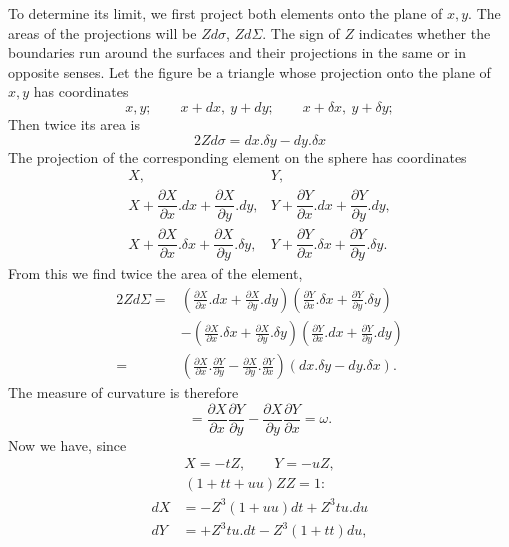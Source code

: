 \par{}%
\noindent\hspace*{1.2em}To determine its limit, we first project both elements onto the plane of $x,y$. The areas of the projections will be $Zd\sigma$, $Zd\Sigma$. The sign of $Z$ indicates whether the boundaries run around the surfaces and their projections in the same or in opposite senses. Let the figure be a triangle whose projection onto the plane of $x,y$ has coordinates
\[
x,y;\qquad x+dx,\ y+dy;\qquad x+\delta x,\ y+\delta y;
\]
Then twice its area is
\[
2Zd\sigma=dx.\delta y-dy.\delta x
\]
The projection of the corresponding element on the sphere has coordinates
\[
\begin{array}{cc}
X,&Y,\\[4pt]
X+\dfrac{\partial X}{\partial x}.dx+\dfrac{\partial X}{\partial y}.dy,&Y+\dfrac{\partial Y}{\partial x}.dx+\dfrac{\partial Y}{\partial y}.dy,\\[6pt]
X+\dfrac{\partial X}{\partial x}.\delta x+\dfrac{\partial X}{\partial y}.\delta y,&Y+\dfrac{\partial Y}{\partial x}.\delta x+\dfrac{\partial Y}{\partial y}.\delta y.
\end{array}
\]
From this we find twice the area of the element,
\[
\begin{aligned}
2Zd\Sigma={}&\left(\frac{\partial X}{\partial x}.dx+\frac{\partial X}{\partial y}.dy\right)\left(\frac{\partial Y}{\partial x}.\delta x+\frac{\partial Y}{\partial y}.\delta y\right)\\
&-\left(\frac{\partial X}{\partial x}.\delta x+\frac{\partial X}{\partial y}.\delta y\right)\left(\frac{\partial Y}{\partial x}.dx+\frac{\partial Y}{\partial y}.dy\right)\\
={}&\left(\frac{\partial X}{\partial x}.\frac{\partial Y}{\partial y}-\frac{\partial X}{\partial y}.\frac{\partial Y}{\partial x}\right)(dx.\delta y-dy.\delta x).
\end{aligned}
\]
The measure of curvature is therefore
\[
=\frac{\partial X}{\partial x}\frac{\partial Y}{\partial y}-\frac{\partial X}{\partial y}\frac{\partial Y}{\partial x}=\omega.
\]
Now we have, since
\[
\begin{gathered}
X=-tZ,\qquad Y=-uZ,\\
(1+tt+uu)ZZ=1:
\end{gathered}
\]
\[
\begin{aligned}
dX&=-Z^{3}(1+uu)dt+Z^{3}tu.du\\
dY&=+Z^{3}tu.dt-Z^{3}(1+tt)du,
\end{aligned}
\]
